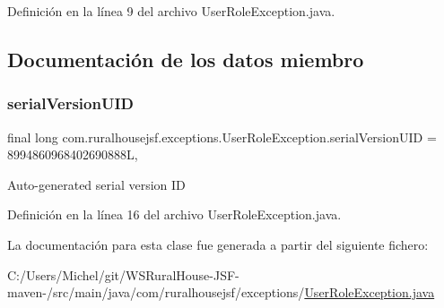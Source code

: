 Definición en la línea 9 del archivo User\+Role\+Exception.\+java.



\subsection{Documentación de los datos miembro}
\mbox{\label{classcom_1_1ruralhousejsf_1_1exceptions_1_1_user_role_exception_a9894bada17e7192af3bfcdd028fd6c57}} 
\subsubsection{\texorpdfstring{serialVersionUID}{serialVersionUID}}
{\footnotesize\ttfamily final long com.\+ruralhousejsf.\+exceptions.\+User\+Role\+Exception.\+serial\+Version\+U\+ID = 8994860968402690888L\hspace{0.3cm}{\ttfamily [static]}, {\ttfamily [private]}}

Auto-\/generated serial version ID 

Definición en la línea 16 del archivo User\+Role\+Exception.\+java.



La documentación para esta clase fue generada a partir del siguiente fichero\+:\begin{DoxyCompactItemize}
\item 
C\+:/\+Users/\+Michel/git/\+W\+S\+Rural\+House-\/\+J\+S\+F-\/maven-\//src/main/java/com/ruralhousejsf/exceptions/\mbox{\hyperlink{_user_role_exception_8java}{User\+Role\+Exception.\+java}}\end{DoxyCompactItemize}
